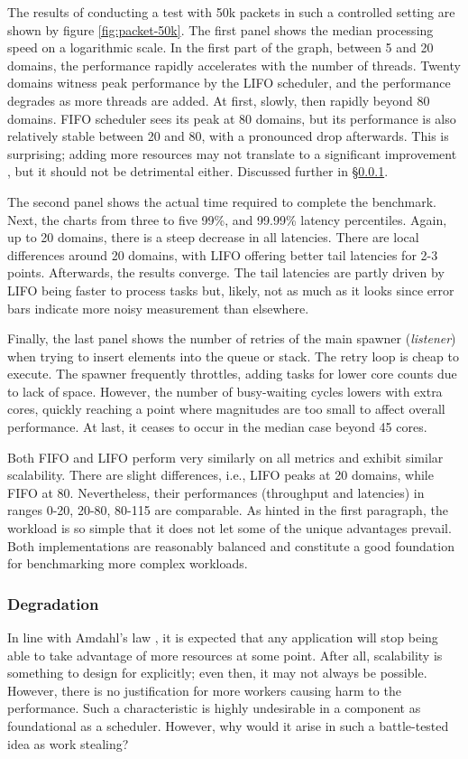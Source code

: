 \documentclass[12pt,a4paper,twoside]{report}
\begin{document}
The results of conducting a test with 50k packets in such a controlled setting are shown by figure \ref{fig:packet-50k}. The first panel shows the median processing speed on a logarithmic scale. In the first part of the graph, between 5 and 20 domains, the performance rapidly accelerates with the number of threads. Twenty domains witness peak performance by the LIFO scheduler, and the performance degrades as more threads are added. At first, slowly, then rapidly beyond 80 domains. FIFO scheduler sees its peak at 80 domains, but its performance is also relatively stable between 20 and 80, with a pronounced drop afterwards. This is surprising; adding more resources may not translate to a significant improvement \cite{amdahl}, but it should not be detrimental either. Discussed further in \S\ref{section:degradation}.

The second panel shows the actual time required to complete the benchmark. Next, the charts from three to five 99\%, and 99.99\% latency percentiles. Again, up to 20 domains, there is a steep decrease in all latencies. There are local differences around 20 domains, with LIFO offering better tail latencies for 2-3 points. Afterwards, the results converge. The tail latencies are partly driven by LIFO being faster to process tasks but, likely, not as much as it looks since error bars indicate more noisy measurement than elsewhere. 

Finally, the last panel shows the number of retries of the main spawner (\textit{listener}) when trying to insert elements into the queue or stack. The retry loop is cheap to execute. The spawner frequently throttles, adding tasks for lower core counts due to lack of space. However, the number of busy-waiting cycles lowers with extra cores, quickly reaching a point where magnitudes are too small to affect overall performance. At last, it ceases to occur in the median case beyond 45 cores. 
 
Both FIFO and LIFO perform very similarly on all metrics and exhibit similar scalability. There are slight differences, i.e., LIFO peaks at 20 domains, while FIFO at 80. Nevertheless, their performances (throughput and latencies) in ranges 0-20, 20-80, 80-115 are comparable. As hinted in the first paragraph, the workload is so simple that it does not let some of the unique advantages prevail. Both implementations are reasonably balanced and constitute a good foundation for benchmarking more complex workloads.

\subsubsection{Degradation}
\label{section:degradation}
In line with Amdahl's law \cite{amdahl}, it is expected that any application will stop being able to take advantage of more resources at some point. After all, scalability is something to design for explicitly; even then, it may not always be possible. However, there is no justification for more workers causing harm to the performance. Such a characteristic is highly undesirable in a component as foundational as a scheduler. However, why would it arise in such a battle-tested idea as work stealing? 
\end{document}
